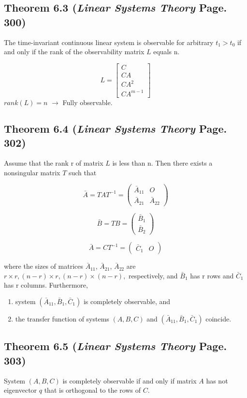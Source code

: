 \documentclass[12pt]{article}
\begin{document}
\subsection*{Theorem 6.3 ({\em Linear Systems Theory} Page. 300)}
The time-invariant continuous linear system is observable for arbitrary $t_1>t_0$ if and only if the rank of the observability matrix $L$ equals n.

$$L=\begin{bmatrix}
C \\
CA \\
CA^2 \\
CA^{m-1}
\end{bmatrix}
$$
$rank(L)=n$ $\rightarrow$ Fully observable.
\subsection*{Theorem 6.4 ({\em Linear Systems Theory} Page. 302)}
Assume that the rank r of matrix $L$ is less than n. Then there exists a nonsingular matrix $T$ such that

$$\bar{A}=TAT^{-1}=\begin{pmatrix}
\bar{A}_{11} & O \\
\bar{A}_{21} & \bar{A}_{22}
\end{pmatrix}
$$

$$\bar{B}=TB=\begin{pmatrix}
\bar{B}_{1}\\
\bar{B}_{2}
\end{pmatrix}
$$

$$\bar{A}=CT^{-1}=\begin{pmatrix}
\bar{C}_{1} & O 
\end{pmatrix}
$$

\noindent
where the sizes of matrices $\bar{A}_{11}$, $\bar{A}_{21}$, $\bar{A}_{22}$ are $r\times r, (n-r)\times r, (n-r)\times (n-r),$ respectively, and $\bar{B}_1$ has r rows and $\bar{C}_1$ has r columns. Furthermore,
\renewcommand{\labelenumiii}{\Roman{enumii}}
\begin{enumerate}
  \item system $(\bar{A}_{11}, \bar{B}_1, \bar{C}_1)$ is completely observable, and
  \item the transfer function of systems $(A, B, C)$ and $(\bar{A}_{11}, \bar{B}_1, \bar{C}_1)$ coincide.
\end{enumerate}

\subsection*{Theorem 6.5 ({\em Linear Systems Theory} Page. 303)}
System $(A, B, C)$ is completely observable if and only if matrix $A$ has not eigenvector $q$ that is orthogonal to the rows of $C$.
\end{document}
